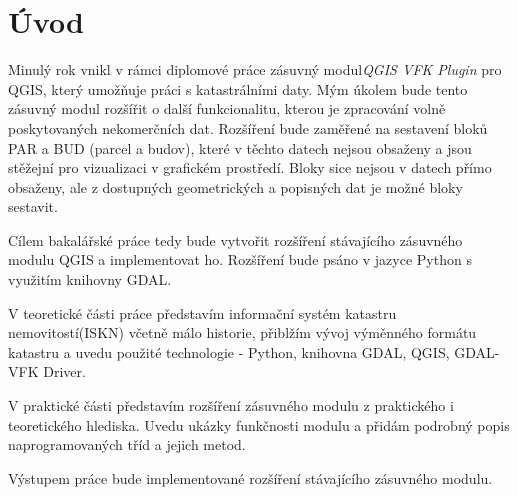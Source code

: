 \chapter{Úvod}
\label{1-uvod}


Minulý rok vnikl v rámci diplomové práce zásuvný modul\textit{QGIS VFK Plugin} pro QGIS, který umožňuje práci s katastrálními daty. Mým úkolem bude tento zásuvný modul rozšířit o další funkcionalitu, kterou je zpracování volně poskytovaných nekomerčních dat. Rozšíření bude zaměřené na sestavení bloků PAR a BUD (parcel a budov), které v těchto datech nejsou obsaženy a jsou stěžejní pro vizualizaci v grafickém prostředí. Bloky sice nejsou v datech přímo obsaženy, ale z dostupných geometrických a popisných dat je možné bloky sestavit.

Cílem bakalářské práce tedy bude vytvořit rozšíření stávajícího zásuvného modulu QGIS a implementovat ho. Rozšíření bude psáno v jazyce Python s využitím knihovny GDAL. 

V teoretické části práce představím informační systém katastru nemovitostí(ISKN) včetně málo historie, přiblžím vývoj výměnného formátu katastru a uvedu
použité technologie - Python, knihovna GDAL, QGIS, GDAL-VFK Driver.

V praktické části představím rozšíření zásuvného modulu z praktického i teoretického hlediska. Uvedu ukázky funkčnosti modulu a přidám podrobný popis naprogramovaných tříd a jejich metod.

Výstupem práce bude implementované rozšíření stávajícího zásuvného modulu.


